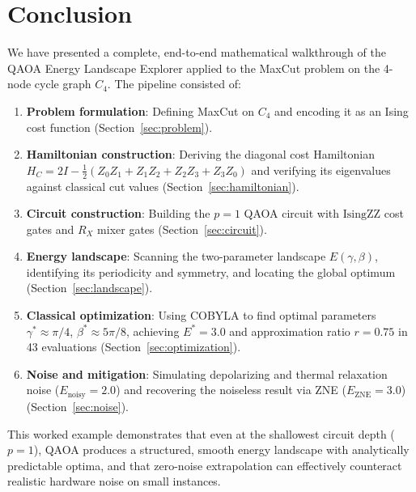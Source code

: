 \documentclass[11pt,a4paper]{article}
\begin{document}
\section{Conclusion}\label{sec:conclusion}

We have presented a complete, end-to-end mathematical walkthrough of the QAOA
Energy Landscape Explorer applied to the MaxCut problem on the 4-node cycle
graph $C_4$.  The pipeline consisted of:

\begin{enumerate}
  \item \textbf{Problem formulation}: Defining MaxCut on $C_4$ and encoding it
        as an Ising cost function (Section~\ref{sec:problem}).
  \item \textbf{Hamiltonian construction}: Deriving the diagonal cost
        Hamiltonian $H_C = 2I - \tfrac{1}{2}(Z_0Z_1 + Z_1Z_2 + Z_2Z_3 +
        Z_3Z_0)$ and verifying its eigenvalues against classical cut values
        (Section~\ref{sec:hamiltonian}).
  \item \textbf{Circuit construction}: Building the $p=1$ QAOA circuit with
        $\mathrm{IsingZZ}$ cost gates and $R_X$ mixer gates
        (Section~\ref{sec:circuit}).
  \item \textbf{Energy landscape}: Scanning the two-parameter landscape
        $E(\gamma,\beta)$, identifying its periodicity and symmetry, and
        locating the global optimum (Section~\ref{sec:landscape}).
  \item \textbf{Classical optimization}: Using COBYLA to find optimal
        parameters $\gamma^*\approx\pi/4$, $\beta^*\approx 5\pi/8$, achieving
        $E^*=3.0$ and approximation ratio $r=0.75$ in 43 evaluations
        (Section~\ref{sec:optimization}).
  \item \textbf{Noise and mitigation}: Simulating depolarizing and thermal
        relaxation noise ($E_{\text{noisy}}=2.0$) and recovering the noiseless
        result via ZNE ($E_{\text{ZNE}}=3.0$)
        (Section~\ref{sec:noise}).
\end{enumerate}

This worked example demonstrates that even at the shallowest circuit depth
($p=1$), QAOA produces a structured, smooth energy landscape with analytically
predictable optima, and that zero-noise extrapolation can effectively
counteract realistic hardware noise on small instances.
\end{document}
